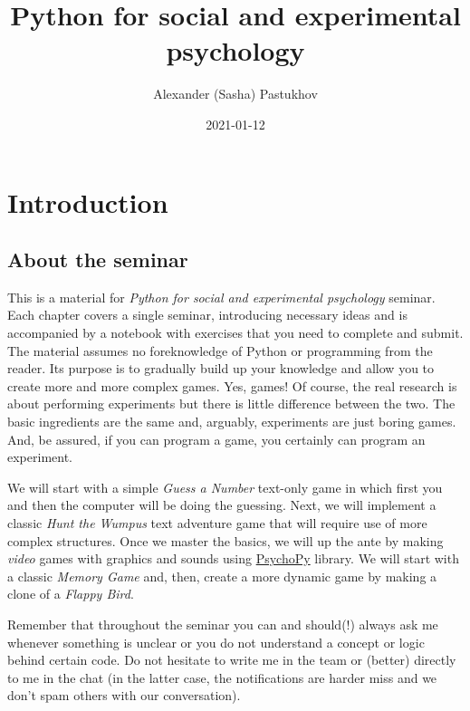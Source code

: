 \documentclass[
]{book}
\title{Python for social and experimental psychology}
\author{Alexander (Sasha) Pastukhov}
\date{2021-01-12}
\begin{document}
\maketitle

{
\setcounter{tocdepth}{1}
\tableofcontents
}
\hypertarget{introduction}{%
\chapter*{Introduction}\label{introduction}}

\hypertarget{about-the-seminar}{%
\section*{About the seminar}\label{about-the-seminar}}

This is a material for \emph{Python for social and experimental psychology} seminar. Each chapter covers a single seminar, introducing necessary ideas and is accompanied by a notebook with exercises that you need to complete and submit. The material assumes no foreknowledge of Python or programming from the reader. Its purpose is to gradually build up your knowledge and allow you to create more and more complex games. Yes, games! Of course, the real research is about performing experiments but there is little difference between the two. The basic ingredients are the same and, arguably, experiments are just boring games. And, be assured, if you can program a game, you certainly can program an experiment.

We will start with a simple \emph{Guess a Number} text-only game in which first you and then the computer will be doing the guessing. Next, we will implement a classic \emph{Hunt the Wumpus} text adventure game that will require use of more complex structures. Once we master the basics, we will up the ante by making \emph{video} games with graphics and sounds using \href{https://psychopy.org/}{PsychoPy} library. We will start with a classic \emph{Memory Game} and, then, create a more dynamic game by making a clone of a \emph{Flappy Bird}.

Remember that throughout the seminar you can and should(!) always ask me whenever something is unclear or you do not understand a concept or logic behind certain code. Do not hesitate to write me in the team or (better) directly to me in the chat (in the latter case, the notifications are harder miss and we don't spam others with our conversation).
\end{document}
